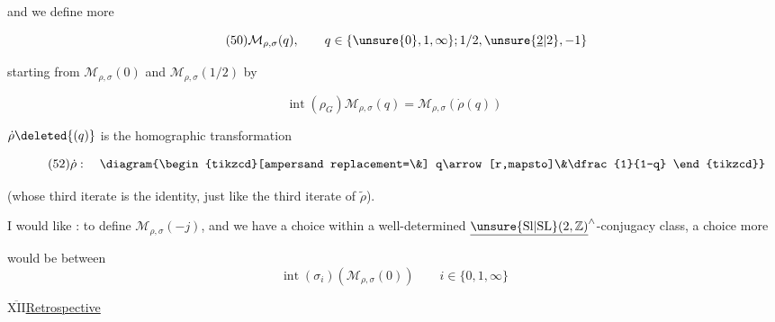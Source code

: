 and we define more 

\begin{equation*}
\tag{50}
\mathcal M_{\rho,\sigma}(q),\qquad
q\in\{\unsure{0},1,\infty\};1/2,\unsure{\underline 2|2},-1\}
\end{equation*}

starting from $\mathcal M_{\rho,\sigma}(0)$ and
$\mathcal M_{\rho,\sigma}(1/2)$ by

\begin{equation*}
\tag{51}
\operatorname{int}(\rho_G)\mathcal M_{\rho,\sigma}(q)
=\mathcal M_{\rho,\sigma}(\dot\rho(q))
\end{equation*}


$\dot\rho\deleted{(q)}$ is the homographic transformation

\begin{equation*}
\tag{52}
\dot\rho:\quad
\diagram{\begin{tikzcd}[ampersand replacement=\&]
q\arrow[r,mapsto]\&\dfrac{1}{1-q}
\end{tikzcd}}
\end{equation*}

(whose third iterate is the identity, just like the third iterate
of $\widetilde\rho$).

I would like : to define $\mathcal M_{\rho,\sigma}(-j)$, and
 we have a choice within a well-determined
$\underline{\unsure{\mathrm{Sl}|\mathrm{SL}}(2,\mathbb Z)}^{\wedge}$-conjugacy class,
a choice more


 would be between
\[
\operatorname{int}(\sigma_i)(\mathcal M_{\rho,\sigma}(0))
\qquad i\in\{0,1,\infty\}
\tag{53}
\]

\uline{$\overline{\mathrm{XII}}$}\qquad\uline{Retrospective}

